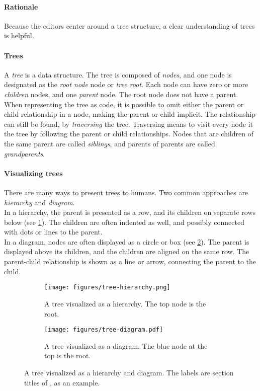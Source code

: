 \paragraph{Rationale}
Because the editors center around a tree structure, a clear understanding of trees is helpful.

\paragraph{Trees}
A \textit{tree} is a data structure.
The tree is composed of \textit{nodes}, and one node is designated as the \textit{root node} node or \textit{tree root}.
Each node can have zero or more \textit{children} nodes, and one \textit{parent} node.
The root node does not have a parent.
When representing the tree as code, it is possible to omit either the parent or child relationship in a node, making the parent or child implicit.
The relationship can still be found, by \textit{traversing} the tree.
Traversing means to visit every node it the tree by following the parent or child relationships.
Nodes that are children of the same parent are called \textit{siblings}, and parents of parents are called \textit{grandparents}.

\paragraph{Visualizing trees}
There are many ways to present trees to humans.
Two common approaches are \textit{hierarchy} and \textit{diagram}.\\

In a hierarchy, the parent is presented as a row, and its children on separate rows below (see \cref{sfig:tree-visualized-hierarchy}).
The children are often indented as well, and possibly connected with dots or lines to the parent.\\

In a diagram, nodes are often displayed as a circle or box (see \cref{sfig:tree-visualized-diagram}).
The parent is displayed above its children, and the children are aligned on the same row.
The parent-child relationship is shown as a line or arrow, connecting the parent to the child.

\begin{figure}[htbp]
    \centering
    \begin{subfigure}[b]{.45\textwidth}
        \centering
        \texttt{[image: figures/tree-hierarchy.png]}
        \caption{A tree visualized as a hierarchy. The top node is the root.}\label{sfig:tree-visualized-hierarchy}
    \end{subfigure}
    \hfill
    \begin{subfigure}[b]{.45\textwidth}
        \centering
        \texttt{[image: figures/tree-diagram.pdf]}
        \caption{A tree visualized as a diagram. The blue node at the top is the root.}\label{sfig:tree-visualized-diagram}
    \end{subfigure}
    \caption{A tree visualized as a hierarchy and diagram. The labels are section titles of \cite{rekstadModelingEnvironmentCloud2020}, as an example.}\label{fig:tree-visualized}
\end{figure}

